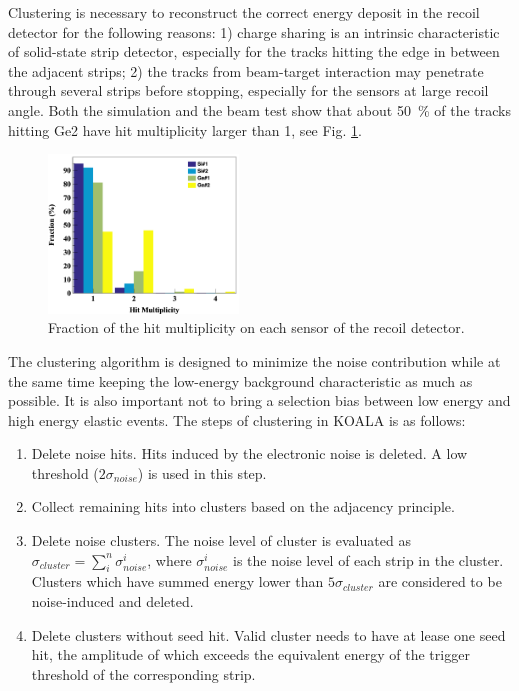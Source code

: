 \documentclass[number,5p]{elsarticle}
\begin{document}
Clustering is necessary to reconstruct the correct energy deposit in the
recoil detector for the following reasons: 1) charge sharing is an intrinsic characteristic of solid-state strip detector, especially
for the tracks hitting the edge in between the adjacent strips; 2) the tracks
from beam-target interaction may penetrate through several strips before
stopping, especially for the sensors  at large recoil angle.
Both the simulation and the beam test show that about \SI{50}{\percent} of the tracks hitting Ge2 have hit multiplicity
larger than 1, see Fig. \ref{fig:multiplicity}.
\begin{figure}[htbp]
  \centering
  \includegraphics[width=0.45\textwidth]{./multiplicity.png}
  \caption{Fraction of the hit multiplicity on each sensor of the recoil detector.}
  \label{fig:multiplicity}
\end{figure}

The clustering algorithm is designed to minimize the noise contribution while
at the same time keeping the low-energy background characteristic as much as possible.
It is also important not to bring a selection bias between low energy and high energy elastic events.
The steps of clustering in KOALA is as follows:
\begin{enumerate}
\item Delete noise hits. Hits induced by the electronic noise is deleted. A low
  threshold ($2\sigma_{noise}$) is used in this step.
\item Collect remaining hits into clusters based on the adjacency principle.
\item Delete noise clusters. The noise level of cluster is evaluated as
  $\sigma_{cluster} = \sum_i^n{\sigma_{noise}^i}$, where $\sigma_{noise}^i$ is
  the noise level of each strip in the cluster. Clusters which have summed
  energy lower than $5\sigma_{cluster}$ are considered to be noise-induced and deleted.
\item Delete clusters without seed hit. Valid cluster needs to have at lease one seed hit, the
  amplitude of which exceeds the equivalent energy of the trigger threshold of
  the corresponding strip.
\end{enumerate}
\end{document}
